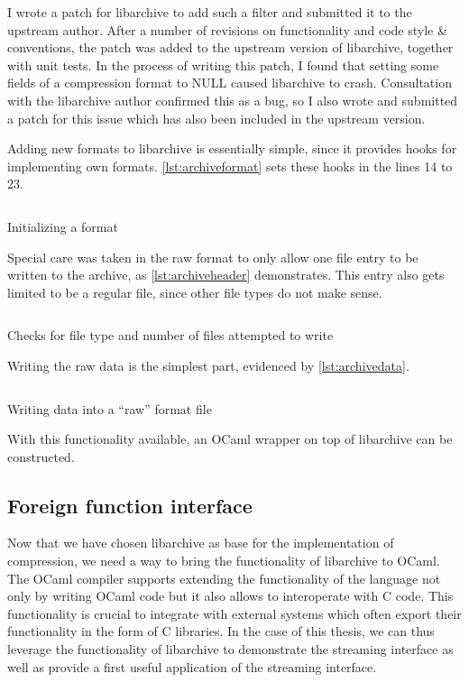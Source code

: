 \documentclass[parskip=half]{scrreprt}
\newcommand\inline[1]{{\addfontfeature{Letters=SmallCaps}#1}}
\begin{document}
I wrote a patch for libarchive to add such a filter and submitted it to the
upstream author. After a number of revisions on functionality and code style \&
conventions, the patch was added to the upstream version of libarchive,
together with unit tests. In the process of writing this patch, I found that
setting some fields of a compression format to \inline{NULL} caused libarchive
to crash. Consultation with the libarchive author confirmed this as a bug, so I
also wrote and submitted a patch for this issue which has also been included in
the upstream version.

Adding new formats to libarchive is essentially simple, since it provides hooks
for implementing own formats. \autoref{lst:archiveformat} sets these hooks in
the lines 14 to 23.

\begin{listing}[h]
  \inputminted[linenos,fontsize=\small]{c}{archive-set-format.c}
  \caption{Initializing a format}
  \label{lst:archiveformat}
\end{listing}

Special care was taken in the raw format to only allow one file entry to be
written to the archive, as \autoref{lst:archiveheader} demonstrates. This entry
also gets limited to be a regular file, since other file types do not make
sense.

\begin{listing}[h]
  \inputminted[linenos,fontsize=\small]{c}{archive-write-header.c}
  \caption{Checks for file type and number of files attempted to write}
  \label{lst:archiveheader}
\end{listing}

Writing the raw data is the simplest part, evidenced by
\autoref{lst:archivedata}.

\begin{listing}[h]
  \inputminted[linenos,fontsize=\small]{c}{archive-write-data.c}
  \caption{Writing data into a \enquote{raw} format file}
  \label{lst:archivedata}
\end{listing}

With this functionality available, an OCaml wrapper on top of libarchive can be
constructed.

\subsection{Foreign function interface}
\label{sec:ffi}

Now that we have chosen libarchive as base for the implementation of
compression, we need a way to bring the functionality of libarchive to OCaml.
The OCaml compiler supports extending the functionality of the language not
only by writing OCaml code but it also allows to interoperate with C code. This
functionality is crucial to integrate with external systems which often export
their functionality in the form of C libraries. In the case of this thesis, we
can thus leverage the functionality of libarchive to demonstrate the streaming
interface as well as provide a first useful application of the streaming
interface.
\end{document}
